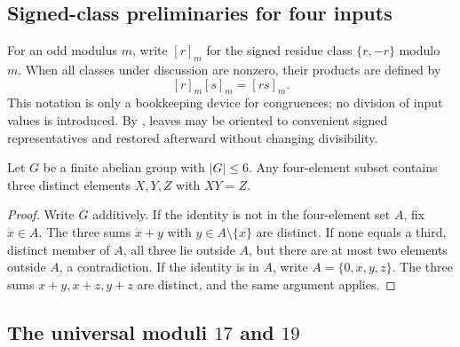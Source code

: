 \subsection{Signed-class preliminaries for four inputs}\label{app:signed-prelim}

For an odd modulus $m$, write $[r]_m$ for the signed residue class
$\{r,-r\}$ modulo $m$.  When all classes under discussion are nonzero, their
products are defined by
\[
 [r]_m[s]_m=[rs]_m.
\]
This notation is only a bookkeeping device for congruences; no division of
input values is introduced.  By , leaves may be oriented
to convenient signed representatives and restored afterward without changing
divisibility.

\begin{lemma}\label{lem:small-signed-group}
Let $G$ be a finite abelian group with $|G|\le6$.  Any four-element subset
contains three distinct elements $X,Y,Z$ with $XY=Z$.
\end{lemma}
\begin{proof}
Write $G$ additively.  If the identity is not in the four-element set $A$,
fix $x\in A$.  The three sums $x+y$ with
$y\in A\setminus\{x\}$ are distinct.  If none equals a third, distinct member
of $A$, all three lie outside $A$, but there are at most two elements outside
$A$, a contradiction.  If the identity is in $A$, write
$A=\{0,x,y,z\}$.  The three sums $x+y,x+z,y+z$ are distinct, and the same
argument applies.
\end{proof}

\subsection{\texorpdfstring{The universal moduli $17$ and $19$}{The universal moduli 17 and 19}}\label{app:p17p19}

